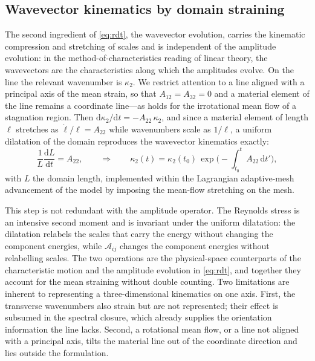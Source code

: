 \documentclass[lineno]{JFM-FLM_Au}
\begin{document}
\subsection{Wavevector kinematics by domain straining}
\label{sec:domain-strain}

The second ingredient of \eqref{eq:rdt}, the wavevector evolution, carries
the kinematic compression and stretching of scales and is independent of
the amplitude evolution: in the method-of-characteristics reading of
linear theory, the wavevectors are the characteristics along which the
amplitudes evolve. On the line the relevant wavenumber is $\kappa_2$. We
restrict attention to a line aligned with a principal axis of the mean
strain, so that $A_{12}=A_{32}=0$ and a material element of the line
remains a coordinate line---as holds for the irrotational mean flow of a
stagnation region. Then
$\mathrm{d}\kappa_2/\mathrm{d}t=-A_{22}\,\kappa_2$, and since a material
element of length $\ell$ stretches as $\dot\ell/\ell=A_{22}$ while
wavenumbers scale as $1/\ell$, a uniform dilatation of the domain
reproduces the wavevector kinematics exactly:
\begin{equation}
  \frac{1}{L}\frac{\mathrm{d}L}{\mathrm{d}t}=A_{22},
  \qquad\Longrightarrow\qquad
  \kappa_2(t)=\kappa_2(t_0)\,
  \exp\!\Big(\!-\!\int_{t_0}^{t}A_{22}\,\mathrm{d}t'\Big),
  \label{eq:dilatation}
\end{equation}
with $L$ the domain length, implemented within the Lagrangian
adaptive-mesh advancement of the model \citep{Lignell2013} by imposing
the mean-flow stretching on the mesh.

This step is not redundant with the amplitude operator. The Reynolds
stress is an intensive second moment and is invariant under the uniform
dilatation: the dilatation relabels the scales that carry the energy
without changing the component energies, while $\mathcal{A}_{ij}$ changes
the component energies without relabelling scales. The two operations are
the physical-space counterparts of the characteristic motion and the
amplitude evolution in \eqref{eq:rdt}, and together they account for the
mean straining without double counting. Two limitations are inherent to
representing a three-dimensional kinematics on one axis. First, the
transverse wavenumbers also strain but are not represented; their
effect is subsumed in the spectral closure, which already supplies the
orientation information the line lacks. Second, a rotational mean flow,
or a line not aligned with a principal axis, tilts the material line
out of the coordinate direction and lies outside the formulation.
\end{document}
